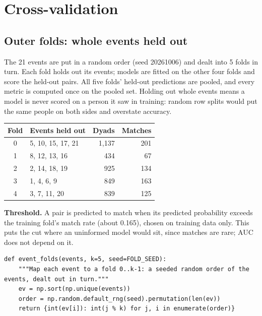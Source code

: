 \documentclass[11pt]{article}
\begin{document}
\section{Cross-validation}\label{sec:cv}

\subsection{Outer folds: whole events held out}

The 21 events are put in a random order (seed 20261006) and dealt into 5 folds in turn. Each fold holds out its events; models are fitted on the other four folds and score the held-out pairs. All five folds' held-out predictions are pooled, and every metric is computed once on the pooled set. Holding out whole events means a model is never scored on a person it saw in training: random row splits would put the same people on both sides and overstate accuracy.

\small
\begin{center}
\begin{tabular}{clrr}
\toprule
\textbf{Fold} & \textbf{Events held out} & \textbf{Dyads} & \textbf{Matches} \\
\midrule
0 & 5, 10, 15, 17, 21 & 1,137 & 201 \\
1 & 8, 12, 13, 16 & 434 & 67 \\
2 & 2, 14, 18, 19 & 925 & 134 \\
3 & 1, 4, 6, 9 & 849 & 163 \\
4 & 3, 7, 11, 20 & 839 & 125 \\
\bottomrule
\end{tabular}
\end{center}
\normalsize

\textbf{Threshold.} A pair is predicted to match when its predicted probability exceeds the training fold's
match rate (about 0.165), chosen on training data only. This puts the cut where an uninformed model would sit, since
matches are rare; AUC does not depend on it.

\begin{lstlisting}[caption={Outer event folds (scripts/modeling.py)}]
def event_folds(events, k=5, seed=FOLD_SEED):
    """Map each event to a fold 0..k-1: a seeded random order of the events, dealt out in turn."""
    ev = np.sort(np.unique(events))
    order = np.random.default_rng(seed).permutation(len(ev))
    return {int(ev[i]): int(j % k) for j, i in enumerate(order)}
\end{lstlisting}
\end{document}
